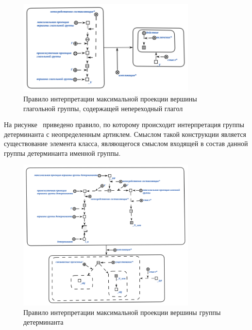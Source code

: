 \begin{figure}[h]
    \centering
    \includegraphics[width=0.8\textwidth]{images/part2/chapter_lang/d_sem_3.png}
    \caption{Правило интерпретации максимальной проекции вершины глагольной группы, содержащей непереходный глагол}
    \label{fig:d_sem_3}
\end{figure}

На рисунке~\textit{} приведено правило, по которому происходит интерпретация группы детерминанта с неопределенным артиклем.
Смыслом такой конструкции является существование элемента класса, являющегося смыслом входящей в состав данной группы детерминанта именной группы.

\begin{figure}[h]
    \centering
    \includegraphics[width=0.8\textwidth]{images/part2/chapter_lang/d_sem_4.png}
    \caption{Правило интерпретации максимальной проекции вершины группы детерминанта}
    \label{d_sem_4}
\end{figure}

